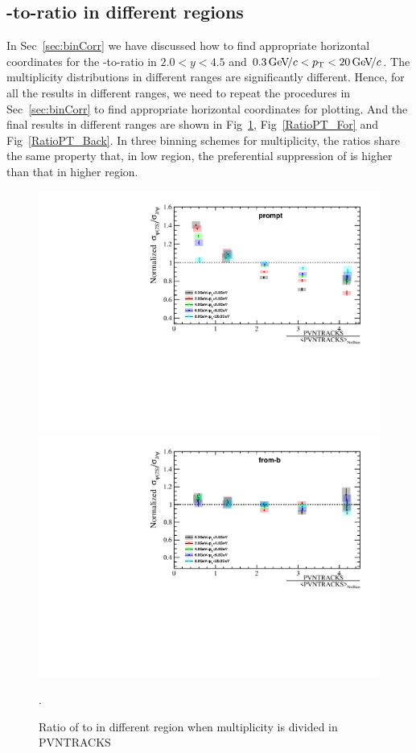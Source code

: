 \subsection{\psitwos-to-\jpsi ratio in different \pt regions}
In Sec~\ref{sec:binCorr} we have discussed how to find appropriate horizontal coordinates for the \psitwos-to-\jpsi ratio in $2.0<y<4.5$ and $0.3\text{\,Ge\kern -0.1em V\!/}c<p_{\mathrm{T}}<20\text{\,Ge\kern -0.1em V\!/}c$. The multiplicity distributions in different \pt ranges are significantly different. Hence, for all the results in different \pt ranges, we need to repeat the procedures in Sec~\ref{sec:binCorr} to find appropriate horizontal coordinates for plotting. And the final results in different \pt ranges are shown in Fig~\ref{RatioPT_PVN}, Fig~\ref{RatioPT_For} and Fig~\ref{RatioPT_Back}. In three binning schemes for multiplicity, the ratios share the same property that, in low \pt region, the preferential suppression of \psitwos is higher than that in higher \pt region.
\begin{figure}[H]
  \begin{center}
	  \includegraphics[width=0.48\linewidth]{pdf/Result/promptRatioPT.pdf}
    \includegraphics[width=0.48\linewidth]{pdf/Result/frombRatioPT.pdf}
  \end{center}
  \caption{Ratio of \psitwos to \jpsi in different \pt region when multiplicity is divided in PVNTRACKS}.
  \label{RatioPT_PVN}
\end{figure}
